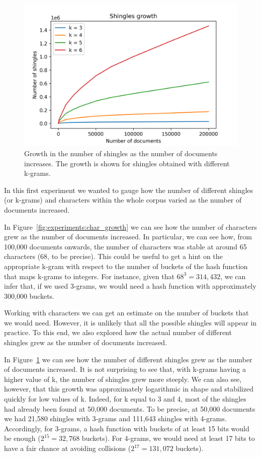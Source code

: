 \documentclass[runningheads]{llncs}
\begin{document}
\begin{figure}
  \center
  \includegraphics[width=1\textwidth]{../img/shingles_growth.png}
  \caption{Growth in the number of shingles as the number of documents increases. The growth is shown for shingles obtained with different k-grams.} 
  \label{fig:experiments:shingles_growth}
\end{figure}

In this first experiment we wanted to gauge how the number of different shingles (or k-grams) and characters within the whole corpus varied as the number of documents increased.

In Figure~\ref{fig:experiments:char_growth} we can see how the number of characters grew as the number of documents increased. In particular, we can see how, from 100,000 documents onwards, the number of characters was stable at around 65 characters (68, to be precise). This could be useful to get a hint on the appropriate k-gram with respect to the number of buckets of the hash function that maps k-grams to integers. For instance, given that $68^3 = 314,432$, we can infer that, if we used 3-grams, we would need a hash function with approximately 300,000 buckets.

Working with characters we can get an estimate on the number of buckets that we would need. However, it is unlikely that all the possible shingles will appear in practice. To this end, we also explored how the actual number of different shingles grew as the number of documents increased.

In Figure~\ref{fig:experiments:shingles_growth} we can see how the number of different shingles grew as the number of documents increased. It is not surprising to see that, with k-grams having a higher value of k, the number of shingles grew more steeply. We can also see, however, that this growth was approximately logarithmic in shape and stabilized quickly for low values of k. Indeed, for k equal to 3 and 4, most of the shingles had already been found at 50,000 documents. To be precise, at 50,000 documents we had 21,580 shingles with 3-grams and 111,643 shingles with 4-grams. Accordingly, for 3-grams, a hash function with buckets of at least 15 bits would be enough ($2^{15} = 32,768$ buckets). For 4-grams, we would need at least 17 bits to have a fair chance at avoiding collisions ($2^{17} = 131,072$ buckets).
\end{document}
